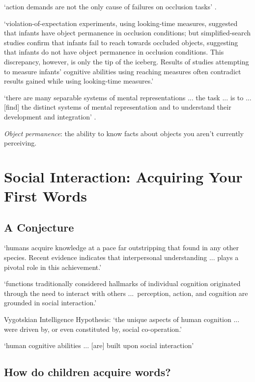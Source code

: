 \documentclass[12pt]{extarticle}
\begin{document}
\begin{multicols}{3}
‘action demands are not the only cause of failures on occlusion tasks’
\citep[p.\ 291]{shinskey:2012_disappearing}.

‘violation-of-expectation experiments, using looking-time measures, suggested that infants
have object permanence in occlusion conditions; but simplified-search studies confirm that
infants fail to reach towards occluded objects, suggesting that infants do not have object
permanence in occlusion conditions. This discrepancy, however, is only the tip of the
iceberg. Results of studies attempting to measure infants’ cognitive abilities using reaching
measures often contradict results gained while using looking-time measures.’
\citep[p.\ 994]{charles:2009_object}

‘there are many separable systems of mental representations ... the task ... is to ... [find] the distinct systems of mental representation and to understand their development and integration’
\citep[p.\ 1522]{Hood:2000bf}.

\textit{Object permanence}:
the ability to know facts about objects you aren't currently perceiving.



\section{Social Interaction: Acquiring Your First Words}

\subsection{A Conjecture}

‘humans acquire knowledge at a pace far outstripping that found in any other species.
Recent evidence indicates that interpersonal understanding ...
plays a pivotal role in this achievement.’
\citep[p.\ 40]{Baldwin:2000qq}

‘functions traditionally considered hallmarks of individual cognition originated through
the need to interact with others ...\ perception, action, and cognition are grounded in
social interaction.’
\citep[p.\ 103]{Knoblich:2006bn}

Vygotskian Intelligence Hypothesis:
‘the unique aspects of human cognition ... were driven by, or even constituted by,
social co-operation.’
\citep[p.\ 1]{Moll:2007gu}

‘human cognitive abilities ... [are] built upon social interaction’
\citep{sinigaglia:2008_roots} %

\subsection{How do children acquire words?}


\end{multicols}
\end{document}
